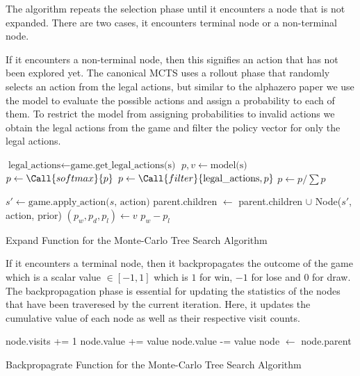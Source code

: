 The algorithm repeats the selection phase until it encounters a node that is not expanded. There are two cases, it encounters terminal node or a non-terminal node. 

If it encounters a non-terminal node, then this signifies an action that has not been explored yet. The canonical MCTS uses a rollout phase that randomly selects an action from the legal actions, but similar to the alphazero paper we use the model to evaluate the possible actions and assign a probability to each of them. To restrict the model from assigning probabilities to invalid actions we obtain the legal actions from the game and filter the policy vector for only the legal actions.

\begin{algorithm}[htb]
    \begin{algorithmic}[1]
            \State $\text{legal\_actions} \gets \text{game.get\_legal\_actions(s)}$
            \State $p, v \gets \text{model(s)}$
            \State $p \gets \Call{softmax}{p}$
            \State $p \gets \Call{filter}{\text{legal\_actions}, p}$
            \State $p \gets p / \sum p$
        
                \State $s' \gets \text{game.apply\_action($s$, action)}$
                \State parent.children $\gets$ parent.children $\cup$ Node($s'$, action, prior)
            \EndFor
            \State $(p_w, p_d, p_l) \gets v$ 
            \State \Return $p_w - p_l$
        \EndFunction
    \end{algorithmic}
    \caption{Expand Function for the Monte-Carlo Tree Search Algorithm}
    \label{alg:expand}
\end{algorithm}

If it encounters a terminal node, then it backpropagates the outcome of the game which is a scalar value $\in [-1, 1]$ which is $1$ for win, $-1$ for lose and $0$ for draw. The backpropagation phase is essential for updating the statistics of the nodes that have been traveresed by the current iteration. Here, it updates the cumulative value of each node as well as their respective visit counts.

\begin{algorithm}[htb]
    \begin{algorithmic}[1]
                \State node.visits += 1
                    \State node.value += value
                \Else
                    \State node.value -= value
                \EndIf
                \State node $\gets$ node.parent
            \EndWhile
        \EndFunction
    \end{algorithmic}
    \caption{Backpropagrate Function for the Monte-Carlo Tree Search Algorithm}
    \label{alg:backpropagate}
\end{algorithm}


